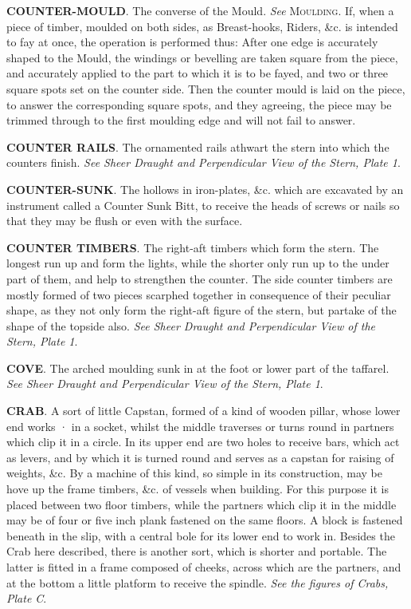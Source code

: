\textbf{COUNTER-MOULD}. The converse of the Mould. \textit{See} \textsc{Moulding}. If, when a piece of timber, moulded on both sides, as Breast-hooks, Riders, \&c. is intended to fay at once, the operation is performed thus: After one edge is accurately shaped to the Mould, the windings or bevelling are taken square from the piece, and accurately applied to the part to which it is to be fayed, and two or three square spots set on the counter side. Then the counter mould is laid on the piece, to answer the corresponding square spots, and they agreeing, the piece may be trimmed through to the first moulding edge and will not fail to answer. 

\textbf{COUNTER RAILS}. The ornamented rails athwart the stern into which the counters finish. \textit{See Sheer Draught and Perpendicular View of the Stern, Plate 1}. 

\textbf{COUNTER-SUNK}. The hollows in iron-plates, \&c. which are excavated by an instrument called a Counter Sunk Bitt, to receive the heads of screws or nails so that they may be flush or even with the surface. 

\textbf{COUNTER TIMBERS}. The right-aft timbers which form the stern. The longest run up and form the lights, while the shorter only run up to the under part of them, and help to strengthen the counter. The side counter timbers are mostly formed of two pieces scarphed together in consequence of their peculiar shape, as they not only form the right-aft figure of the stern, but partake of the shape of the topside also. \textit{See Sheer Draught and Perpendicular View of the Stern, Plate 1}. 

\textbf{COVE}. The arched moulding sunk in at the foot or lower part of the taffarel. \textit{See Sheer Draught and Perpendicular View of the Stern, Plate 1}. 

\textbf{CRAB}. A sort of little Capstan, formed of a kind of wooden pillar, whose lower end works · in a socket, whilst the middle traverses or turns round in partners which clip it in a circle. In its upper end are two holes to receive bars, which act as levers, and by which it is turned round and serves as a capstan for raising of weights, \&c. By a machine of this kind, so simple in its construction, may be hove up the frame timbers, \&c. of vessels when building. For this purpose it is placed between two floor timbers, while the partners which clip it in the middle may be of four or five inch plank fastened on the same floors. A block is fastened beneath in the slip, with a central bole for its lower end to work in. Besides the Crab here described, there is another sort, which is shorter and portable. The latter is fitted in a frame composed of cheeks, across which are the partners, and at the bottom a little platform to receive the spindle. \textit{See the figures of Crabs, Plate C}. 

